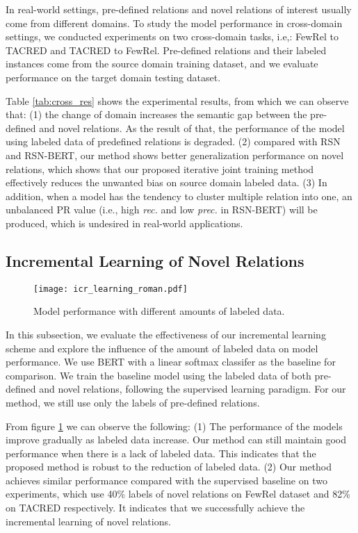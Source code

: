 \documentclass[11pt]{article}
\begin{document}
        In real-world settings, pre-defined relations and novel relations of interest usually come from different domains. To study the model performance in cross-domain settings, we conducted experiments on two cross-domain tasks, i.e,: FewRel to TACRED and TACRED to FewRel. Pre-defined relations and their labeled instances come from the source domain training dataset, and we evaluate performance on the target domain testing dataset. 
        
        Table \ref{tab:cross_res} shows the experimental results, from which we can observe that: (1) the change of domain increases the semantic gap between the pre-defined and novel relations. As the result of that, the performance of the model using labeled data of predefined relations is degraded. (2) compared with RSN and RSN-BERT, our method shows better generalization performance on novel relations, which shows that our proposed iterative joint training method effectively reduces the unwanted bias on source domain labeled data. (3) In addition, when a model has the tendency to cluster multiple relation into one, an unbalanced PR value (i.e., high \textit{rec.} and low \textit{prec.} in RSN-BERT) will be produced, which is undesired in real-world applications.
     
    \subsection{Incremental Learning of Novel Relations}
        \begin{figure}[t]
            \texttt{[image: icr\_learning\_roman.pdf]}
            \caption{Model performance with different amounts of labeled data.}
            \label{fig:icr_learning}
        \end{figure}
        In this subsection, we evaluate the effectiveness of our incremental learning scheme and explore the influence of the amount of labeled data on model performance. We use BERT with a linear softmax classifer as the baseline for comparison. We train the baseline model using the labeled data of both pre-defined and novel relations, following the supervised learning paradigm. For our method, we still use only the labels of pre-defined relations. 



        From figure \ref{fig:icr_learning} we can observe the following: (1) The performance of the models improve gradually as labeled data increase. Our method can still maintain good performance when there is a lack of labeled data. This indicates that the proposed method is robust to the reduction of labeled data. (2) Our method achieves similar performance compared with the supervised baseline on  two experiments, which use 40\% labels of novel relations on FewRel dataset and 82\% on TACRED respectively. It indicates that we successfully achieve the incremental learning of novel relations.
        
\end{document}
